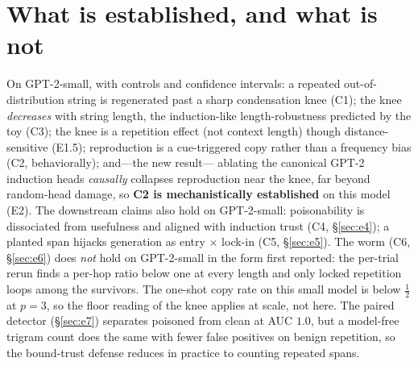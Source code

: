 \documentclass[11pt]{article}
\theoremstyle{plain}
\theoremstyle{definition}
\theoremstyle{remark}
\begin{document}
\section{What is established, and what is not}\label{sec:honesty}
On GPT-2-small, with controls and confidence intervals: a repeated out-of-distribution
string is regenerated past a sharp condensation knee (C1); the knee \emph{decreases} with
string length, the induction-like length-robustness predicted by the toy (C3); the knee is a
repetition effect (not context length) though distance-sensitive (E1.5); reproduction is a
cue-triggered copy rather than a frequency bias (C2, behaviorally); and---the new result---
ablating the canonical GPT-2 induction heads \emph{causally} collapses reproduction near the
knee, far beyond random-head damage, so \textbf{C2 is mechanistically established} on this
model (E2). The downstream claims also hold on GPT-2-small: poisonability is dissociated from
usefulness and aligned with induction trust (C4, \S\ref{sec:e4}); a planted span hijacks
generation as entry$\,\times\,$lock-in (C5, \S\ref{sec:e5}). The worm (C6, \S\ref{sec:e6}) does
\emph{not} hold on GPT-2-small in the form first reported: the per-trial rerun finds a per-hop
ratio below one at every length and only locked repetition loops among the survivors. The
one-shot copy rate on this small model is below $\tfrac12$ at $p{=}3$, so the floor reading of
the knee applies at scale, not here. The paired detector (\S\ref{sec:e7}) separates poisoned
from clean at AUC $1.0$, but a model-free trigram count does the same with fewer false
positives on benign repetition, so the bound-trust defense reduces in practice to counting
repeated spans.
\end{document}
